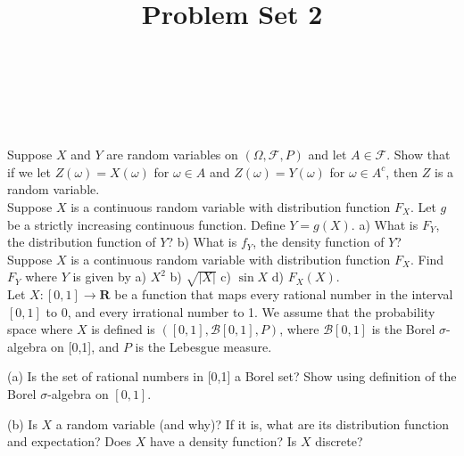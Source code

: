\documentclass[10pt]{amsart}
\begin{document}
\noindent
{} \\
 \\
 \\
\title{Problem Set 2}
\maketitle

 Suppose $X$ and $Y$ are random variables on $(\Omega, \mathcal{F},P)$ and let $A\in \mathcal{F}$. Show that if we let $Z(\omega)=X(\omega)$ for $\omega \in A$ and $Z(\omega)=Y(\omega)$ for $\omega \in A^c$, then $Z$ is a random variable. 
\\

 Suppose $X$ is a continuous random variable with distribution function $F_X$. Let $g$ be a strictly increasing continuous function. Define $Y=g(X)$. a) What is $F_Y$, the distribution function of $Y$? b) What is $f_Y$, the density function of $Y$?
\\

 Suppose $X$ is a continuous random variable with distribution function $F_X$. Find $F_Y$ where $Y$ is given by a) $X^2$ b) $\sqrt{|X|}$ c) $\sin X$ d) $F_X(X)$.
\\

  Let $X: [0,1] \to \mathbf{R}$ be a function that maps every rational number in the interval $[0,1]$ to 0, and every irrational number to 1. We assume that the probability space where $X$ is defined is $([0,1],\mathcal{B}[0,1],P)$, where $\mathcal{B}[0,1]$ is the Borel $\sigma$-algebra on [0,1], and $P$ is the Lebesgue measure. 

(a) Is the set of rational numbers in [0,1] a Borel set? Show using definition of the Borel  $\sigma$-algebra on $[0,1]$. 

(b) Is $X$ a random variable (and why)? If it is, what are its distribution function and expectation? Does $X$ have a density function? Is $X$ discrete?
\end{document}
